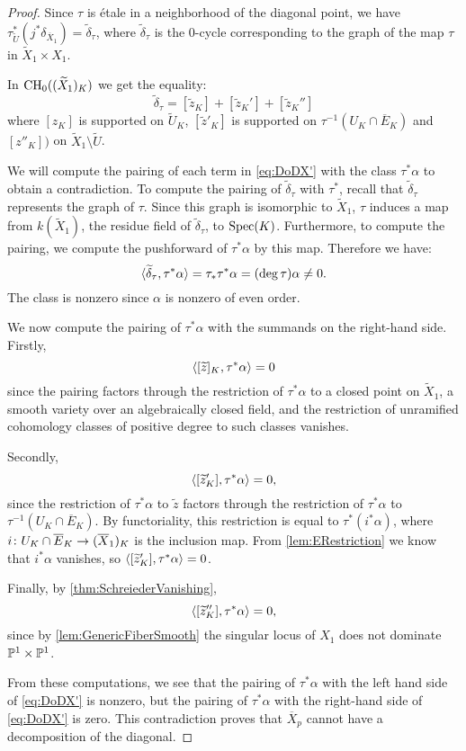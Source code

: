\begin{proof}
        Since $\tau$ is \'etale in a neighborhood of the diagonal point, we have $\tau_{\widetilde{U}}^*(j^* \delta_{\overline{X}_1}) = \widetilde{\delta}_{\tau}$, where $\widetilde{\delta}_\tau$ is the $0$-cycle corresponding to the graph of the map $\tau$ in $\widetilde{X}_1 \times X_1$.

        In $\CH_0((\widetilde{X}_1)_K)$ we get the equality:
        \begin{equation}
          \label{eq:DoDX'}
          \widetilde{\delta}_{\tau} = [\widetilde{z}_{K}] + [\widetilde{z}_{K}'] + [\widetilde{z}_{K}'']
        \end{equation}
        where $[z_{K}]$ is supported on $\widetilde{U}_{K}$, $[\widetilde{z}'_{K}]$ is supported on $\tau^{-1}(U_{K} \cap \overline{E}_{K})$ and $[z''_{K}])$ on $\widetilde{X}_1 \setminus \widetilde{U}$.

We will compute the pairing of each term in \eqref{eq:DoDX'} with the class $\tau^* \alpha$ to obtain a contradiction. To compute the pairing of $\widetilde{\delta}_{\tau}$ with $\tau^*$, recall that $\widetilde{\delta}_{\tau}$ represents the graph of $\tau$. Since this graph is isomorphic to $\widetilde{X}_1$, $\tau$ induces a map from $k(\widetilde{X}_1)$, the residue field of $\widetilde{\delta}_{\tau}$, to $\Spec(K)$. Furthermore, to compute the pairing, we compute the pushforward of $\tau^* \alpha$ by this map. Therefore we have:
        \[\ip{\widetilde{\delta}_{\tau},\tau^*\alpha} = \tau_* \tau^* \alpha = (\deg \tau) \alpha \neq 0.\]
The class is nonzero since $\alpha$ is nonzero of even order. 

We now compute the pairing of $\tau^* \alpha$ with the summands on the right-hand side. Firstly,
\[\ip{[\widetilde{z}]_{K},\tau^*\alpha} = 0 \] since the pairing factors through the restriction of $\tau^*\alpha$ to a closed point on $\widetilde{X}_1$, a smooth variety over an algebraically closed field, and the restriction of unramified cohomology classes of positive degree to such classes vanishes. 

Secondly,
\[ \ip{[\widetilde{z}'_{K}], \tau^* \alpha} = 0, \]
 since the restriction of $\tau^* \alpha$ to $\widetilde{z}$  factors through the restriction of $\tau^* \alpha$ to $\tau^{-1}(U_{K} \cap \overline{E}_{K})$. By functoriality, this restriction is equal to $\tau^*(i^* \alpha)$, where $i \from U_{K} \cap \overline{E}_{K} \to (\overline{X}_1)_{K}$ is the inclusion map. From \cref{lem:ERestriction} we know that $i^* \alpha$ vanishes, so $\ip{[\widetilde{z}'_{K}],\tau^*\alpha} = 0$.

Finally, by \cref{thm:SchreiederVanishing},
\[\ip{[\widetilde{z}''_{K}],\tau^*\alpha} = 0,\]
 since by \cref{lem:GenericFiberSmooth} the singular locus of $X_1$ does not dominate $\P^1 \times \P^1$.

From these computations, we see that the pairing of $\tau^*\alpha$ with the left hand side of \eqref{eq:DoDX'} is nonzero, but the pairing of $\tau^*\alpha$ with the right-hand side of \eqref{eq:DoDX'} is zero. This contradiction proves that $\overline{X}_p$ cannot have a decomposition of the diagonal.        
\end{proof}	

